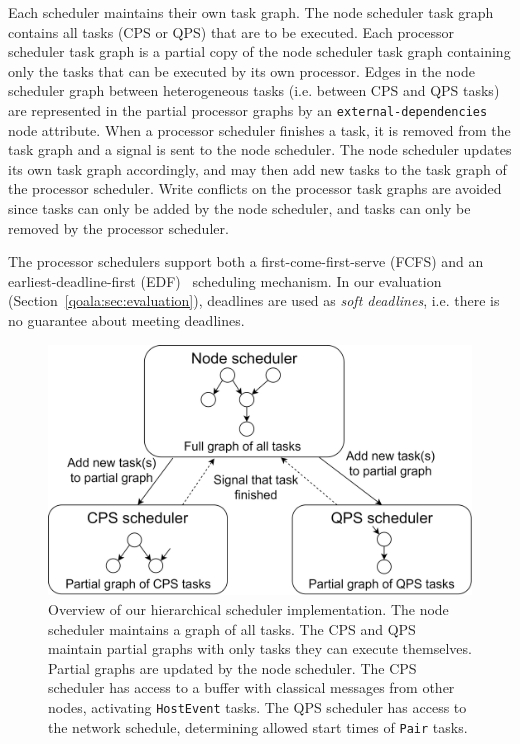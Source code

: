 Each scheduler maintains their own task graph.
The node scheduler task graph contains all tasks (CPS or QPS) that are to be executed.
Each processor scheduler task graph is a partial copy of the node scheduler task graph containing only the tasks that can be executed by its own processor.
Edges in the node scheduler graph between heterogeneous tasks (i.e. between CPS and QPS tasks) are represented in the partial processor graphs by an \texttt{external-dependencies} node attribute. 
When a processor scheduler finishes a task, it is removed from the task graph and a signal is sent to the node scheduler.
The node scheduler updates its own task graph accordingly, and may then add new tasks to the task graph of the processor scheduler.
Write conflicts on the processor task graphs are avoided since tasks can only be added by the node scheduler, and tasks can only be removed by the processor scheduler.

The processor schedulers support both a first-come-first-serve (FCFS) and an earliest-deadline-first (EDF)~\cite{silberschatz2006operating} scheduling mechanism.
In our evaluation (Section~\ref{qoala:sec:evaluation}), deadlines are used as \textit{soft deadlines}, i.e. there is no guarantee about meeting deadlines.

\begin{figure}%
    \centering
    \includegraphics[width=\columnwidth]{figures/qoala/scheduler_components.png}
    \caption{Overview of our hierarchical scheduler implementation.
    The node scheduler maintains a graph of all tasks. The CPS and QPS maintain partial graphs with only tasks they can execute themselves. Partial graphs are updated by the node scheduler. 
    The CPS scheduler has access to a buffer with classical messages from other nodes, activating \texttt{HostEvent} tasks. The QPS scheduler has access to the network schedule, determining allowed start times of \texttt{Pair} tasks.}
    \label{fig:scheduler_impl}
\end{figure}




